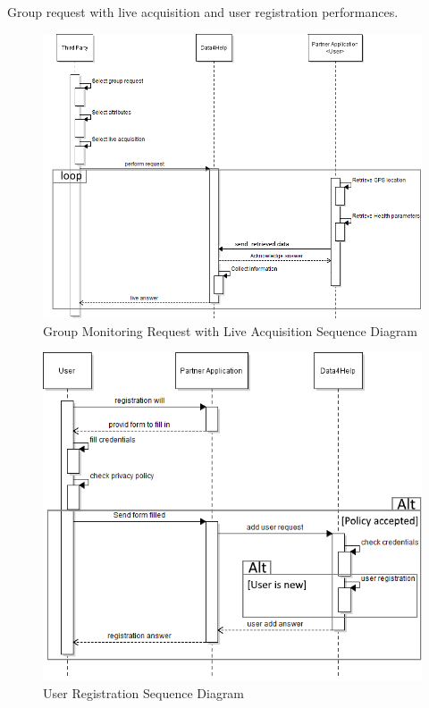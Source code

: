 \begin{enumerate}
\newpage
Group request with live acquisition and user registration performances.
\begin{figure}[H]
\centering
\includegraphics[scale=0.67]{Images/Seq_Data4Help_live.png}
\caption{Group Monitoring Request with Live Acquisition Sequence Diagram}
\end{figure}
\begin{figure}[H]
\centering
\includegraphics[scale=0.67]{Images/Seq_Data4Help_registration.png}
\caption{User Registration Sequence Diagram}
\end{figure}


\end{enumerate}
